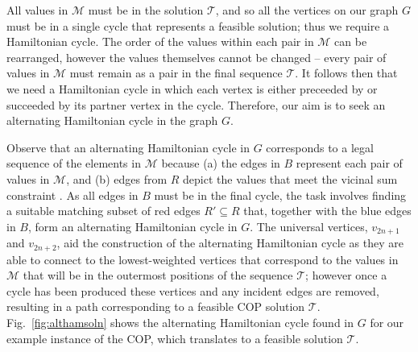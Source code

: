 \documentclass[a4paper,11pt,authoryear]{elsarticle}
\begin{document}
\noindent All values in $\mathcal{M}$ must be in the solution $\mathcal{T}$, and so all the vertices on our graph $G$ must be in a single cycle that represents a feasible solution; thus we require a Hamiltonian cycle. The order of the values within each pair in $\mathcal{M}$ can be rearranged, however the values themselves cannot be changed -- every pair of values in $\mathcal{M}$ must remain as a pair in the final sequence $\mathcal{T}$. It follows then that we need a Hamiltonian cycle in which each vertex is either preceeded by or succeeded by its partner vertex in the cycle. Therefore, our aim is to seek an alternating Hamiltonian cycle in the graph $G$.


Observe that an alternating Hamiltonian cycle in $G$ corresponds to a legal sequence of the elements in $\mathcal{M}$ because (a) the edges in $B$ represent each pair of values in $\mathcal{M}$, and (b) edges from $R$ depict the values that meet the vicinal sum constraint \citep{hawa2020t}. As all edges in $B$ must be in the final cycle, the task involves finding a suitable matching subset of red edges $R' \subseteq R$ that, together with the blue edges in $B$, form an alternating Hamiltonian cycle in $G$. The universal vertices, $v_{2n+1}$ and $v_{2n+2}$, aid the construction of the alternating Hamiltonian cycle as they are able to connect to the lowest-weighted vertices that correspond to the values in $\mathcal{M}$ that will be in the outermost positions of the sequence $\mathcal{T}$; however once a cycle has been produced these vertices and any incident edges are removed, resulting in a path corresponding to a feasible COP solution $\mathcal{T}$. Fig.~\ref{fig:althamsoln} shows the alternating Hamiltonian cycle found in $G$ for our example instance of the COP, which translates to a feasible solution $\mathcal{T}$.
\end{document}
